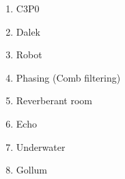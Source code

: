 \documentclass[hidelinks,a4paper,11pt]{article}
\begin{document}
\begin{mdframed}
\begin{itemize}
		\begin{enumerate}
			\item C3P0 
			\item Dalek
			\item Robot
			\item Phasing (Comb filtering)
			\item Reverberant room
			\item Echo
			\item Underwater
			\item Gollum
		\end{enumerate}
\end{itemize}
\begin{figure}[H]
  \begin{center}
  \end{center}
\end{figure}
\end{mdframed}
\vspace*{\baselineskip}
\end{document}
